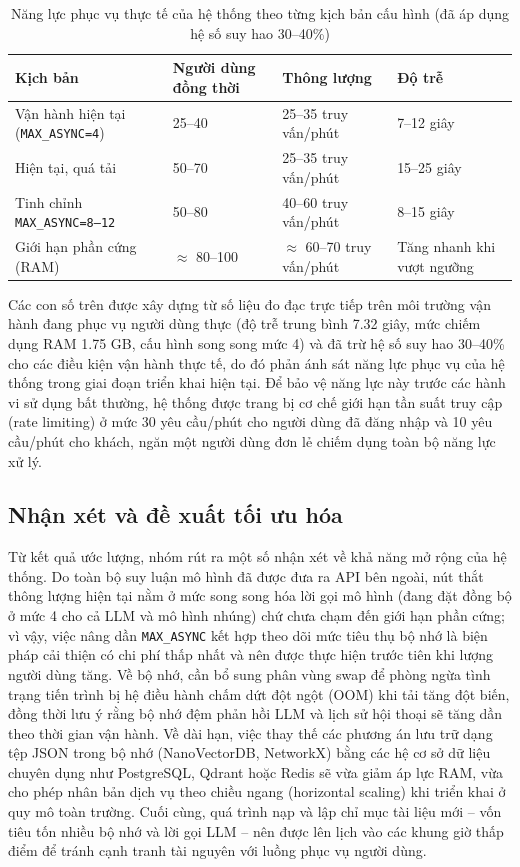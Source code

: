 \begin{table}[H]
    \centering
    \renewcommand{\arraystretch}{1.4}
    \caption{Năng lực phục vụ thực tế của hệ thống theo từng kịch bản cấu hình (đã áp dụng hệ số suy hao 30--40\%)}
    \label{tab:capacity_estimate}
    \begin{tabular}{|p{4.4cm}|p{2.6cm}|p{2.4cm}|p{2.8cm}|}
        \hline
        \textbf{Kịch bản} & \textbf{Người dùng đồng thời} & \textbf{Thông lượng} & \textbf{Độ trễ} \\ \hline
        Vận hành hiện tại (\texttt{MAX\_ASYNC=4}) & 25--40 & 25--35 truy vấn/phút & 7--12 giây \\ \hline
        Hiện tại, quá tải & 50--70 & 25--35 truy vấn/phút & 15--25 giây \\ \hline
        Tinh chỉnh \texttt{MAX\_ASYNC=8--12} & 50--80 & 40--60 truy vấn/phút & 8--15 giây \\ \hline
        Giới hạn phần cứng (RAM) & $\approx$ 80--100 & $\approx$ 60--70 truy vấn/phút & Tăng nhanh khi vượt ngưỡng \\ \hline
    \end{tabular}
\end{table}

Các con số trên được xây dựng từ số liệu đo đạc trực tiếp trên môi trường vận hành đang phục vụ người dùng thực (độ trễ trung bình 7.32 giây, mức chiếm dụng RAM 1.75 GB, cấu hình song song mức 4) và đã trừ hệ số suy hao 30--40\% cho các điều kiện vận hành thực tế, do đó phản ánh sát năng lực phục vụ của hệ thống trong giai đoạn triển khai hiện tại. Để bảo vệ năng lực này trước các hành vi sử dụng bất thường, hệ thống được trang bị cơ chế giới hạn tần suất truy cập (rate limiting) ở mức 30 yêu cầu/phút cho người dùng đã đăng nhập và 10 yêu cầu/phút cho khách, ngăn một người dùng đơn lẻ chiếm dụng toàn bộ năng lực xử lý.

\subsection{Nhận xét và đề xuất tối ưu hóa}
Từ kết quả ước lượng, nhóm rút ra một số nhận xét về khả năng mở rộng của hệ thống. Do toàn bộ suy luận mô hình đã được đưa ra API bên ngoài, nút thắt thông lượng hiện tại nằm ở mức song song hóa lời gọi mô hình (đang đặt đồng bộ ở mức 4 cho cả LLM và mô hình nhúng) chứ chưa chạm đến giới hạn phần cứng; vì vậy, việc nâng dần \texttt{MAX\_ASYNC} kết hợp theo dõi mức tiêu thụ bộ nhớ là biện pháp cải thiện có chi phí thấp nhất và nên được thực hiện trước tiên khi lượng người dùng tăng. Về bộ nhớ, cần bổ sung phân vùng swap để phòng ngừa tình trạng tiến trình bị hệ điều hành chấm dứt đột ngột (OOM) khi tải tăng đột biến, đồng thời lưu ý rằng bộ nhớ đệm phản hồi LLM và lịch sử hội thoại sẽ tăng dần theo thời gian vận hành. Về dài hạn, việc thay thế các phương án lưu trữ dạng tệp JSON trong bộ nhớ (NanoVectorDB, NetworkX) bằng các hệ cơ sở dữ liệu chuyên dụng như PostgreSQL, Qdrant hoặc Redis sẽ vừa giảm áp lực RAM, vừa cho phép nhân bản dịch vụ theo chiều ngang (horizontal scaling) khi triển khai ở quy mô toàn trường. Cuối cùng, quá trình nạp và lập chỉ mục tài liệu mới -- vốn tiêu tốn nhiều bộ nhớ và lời gọi LLM -- nên được lên lịch vào các khung giờ thấp điểm để tránh cạnh tranh tài nguyên với luồng phục vụ người dùng.

